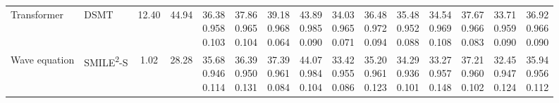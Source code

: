 \documentclass[letterpaper]{article} %
\newcommand{\smiletwo}{SMILE\textsuperscript{2}}
\begin{document}
\begin{table}[!t]
{\begin{tabular}{ll|cc|*{10}{c}|c}
\rowcolor{compareorange}
Transformer & DSMT~\cite{luo2025dsmt} & 12.40 & 44.94 & \makecell{36.38\\0.958\\0.103} & \makecell{37.86\\0.965\\0.104} & \makecell{39.18\\0.968\\0.064} & \makecell{43.89\\0.985\\0.090} & \makecell{34.03\\0.965\\0.071} & \makecell{36.48\\0.972\\0.094} & \makecell{35.48\\0.952\\0.088} & \makecell{34.54\\0.969\\0.108} & \makecell{37.67\\0.966\\0.083} & \makecell{33.71\\0.959\\0.090} & \makecell{36.92\\0.966\\0.090} \\
\rowcolor{oursgreen}
Wave equation & \smiletwo-S & 1.02 & 28.28 & \makecell{35.68\\0.946\\0.114} & \makecell{36.39\\0.950\\0.131} & \makecell{37.39\\0.961\\0.084} & \makecell{44.07\\0.984\\0.104} & \makecell{33.42\\0.955\\0.086} & \makecell{35.20\\0.961\\0.123} & \makecell{34.29\\0.936\\0.101} & \makecell{33.27\\0.957\\0.148} & \makecell{37.21\\0.960\\0.102} & \makecell{32.45\\0.947\\0.124} & \makecell{35.94\\0.956\\0.112} \\

\end{tabular}}
\end{table}
\end{document}
